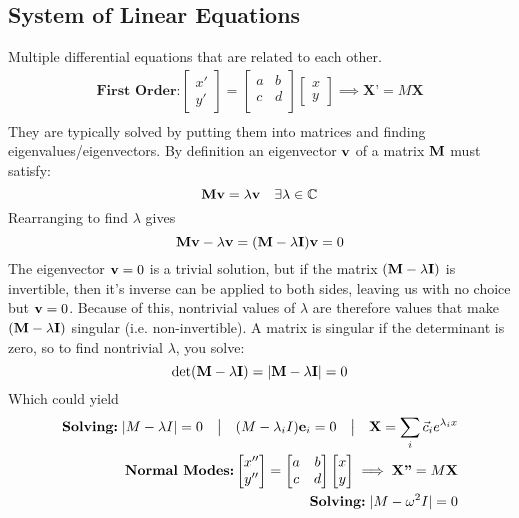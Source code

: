 \subsection{System of Linear Equations}
    Multiple differential equations that are related to each other. 
    \begin{align*}
        \textbf{First Order:}%
        \begin{bmatrix}
        x'\\
        y'
        \end{bmatrix}
        =
        \begin{bmatrix}
        a&b\\
        c&d\\
        \end{bmatrix}
        \begin{bmatrix}
        x\\
        y
        \end{bmatrix}\implies \textbf{X'}=M\textbf{X}\\
    \end{align*}
    They are typically solved by putting them into matrices and finding eigenvalues/eigenvectors. By definition an eigenvector $\vb{v}$ of a matrix $\vb{M}$ must satisfy: 
    \[\vb{M}\vb{v}=\lambda\vb{v}\quad\exists\lambda\in\mathbb{C}\]
    Rearranging to find $\lambda$ gives
    \begin{equation*}
        \vb{M}\vb{v}-\lambda\vb{v}=(\vb{M}-\lambda\vb{I})\vb{v}=0
    \end{equation*}
    The eigenvector $\vb{v}=0$ is a trivial solution, but if the matrix $(\vb{M}-\lambda\vb{I})$ is invertible, then it's inverse can be applied to both sides, leaving us with no choice but $\vb{v}=0$. Because of this, nontrivial values of $\lambda$ are therefore values that make $(\vb{M}-\lambda\vb{I})$ singular (i.e. non-invertible). 
    A matrix is singular if the determinant is zero, so to find nontrivial $\lambda$, you solve: 
    \begin{equation*}
        \det(\vb{M}-\lambda\vb{I})=\qty|\vb{M}-\lambda\vb{I}|=0
    \end{equation*}
    Which could yield 
    \begin{align*}
        \textbf{Solving:}\; |M-\lambda I|=0\quad\big{|}\quad  (M-\lambda_iI)\vb{e}_i=0 \quad\big{|}\quad \textbf{X}=\sum_i\vec{c}_ie^{\lambda_ix}\\%
        \textbf{Normal Modes:}%
        \begin{bmatrix}
        x''\\
        y''
        \end{bmatrix}
        =
        \begin{bmatrix}
        a&b\\
        c&d\\
        \end{bmatrix}
        \begin{bmatrix}
        x\\
        y
        \end{bmatrix}\implies \textbf{X''}=M\textbf{X}\\
        \textbf{Solving:}\; |M-\omega^2 I|=0 %
    \end{align*}
\newpage
